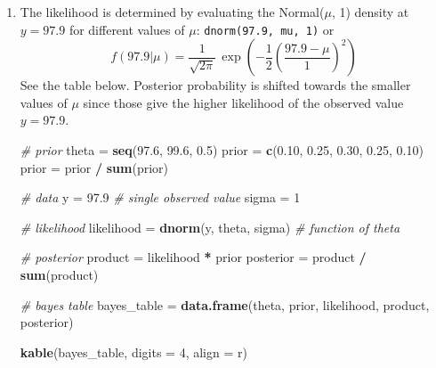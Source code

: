 \documentclass[
]{book}
\newenvironment{Shaded}{\begin{snugshade}}{\end{snugshade}}
\newcommand{\CommentTok}[1]{\textcolor[rgb]{0.56,0.35,0.01}{\textit{#1}}}
\newcommand{\DataTypeTok}[1]{\textcolor[rgb]{0.13,0.29,0.53}{#1}}
\newcommand{\DecValTok}[1]{\textcolor[rgb]{0.00,0.00,0.81}{#1}}
\newcommand{\FloatTok}[1]{\textcolor[rgb]{0.00,0.00,0.81}{#1}}
\newcommand{\KeywordTok}[1]{\textcolor[rgb]{0.13,0.29,0.53}{\textbf{#1}}}
\newcommand{\NormalTok}[1]{#1}
\newcommand{\OperatorTok}[1]{\textcolor[rgb]{0.81,0.36,0.00}{\textbf{#1}}}
\newcommand{\StringTok}[1]{\textcolor[rgb]{0.31,0.60,0.02}{#1}}
\theoremstyle{definition}
\theoremstyle{definition}
\theoremstyle{definition}
\theoremstyle{remark}
\begin{document}
\begin{enumerate}
\def\labelenumi{\arabic{enumi}.}
\item
  The likelihood is determined by evaluating the Normal(\(\mu\), 1) density at \(y=97.9\) for different values of \(\mu\): \texttt{dnorm(97.9,\ mu,\ 1)} or
  \[
  f(97.9|\mu)  = \frac{1}{\sqrt{2\pi}}\,\exp\left(-\frac{1}{2}\left(\frac{97.9-\mu}{1}\right)^2\right)
  \]
  See the table below. Posterior probability is shifted towards the smaller values of \(\mu\) since those give the higher likelihood of the observed value \(y=97.9\).

\begin{Shaded}
\begin{Highlighting}[]
\CommentTok{\# prior}
\NormalTok{theta =}\StringTok{ }\KeywordTok{seq}\NormalTok{(}\FloatTok{97.6}\NormalTok{, }\FloatTok{99.6}\NormalTok{, }\FloatTok{0.5}\NormalTok{)}
\NormalTok{prior =}\StringTok{ }\KeywordTok{c}\NormalTok{(}\FloatTok{0.10}\NormalTok{, }\FloatTok{0.25}\NormalTok{, }\FloatTok{0.30}\NormalTok{, }\FloatTok{0.25}\NormalTok{, }\FloatTok{0.10}\NormalTok{)}
\NormalTok{prior =}\StringTok{ }\NormalTok{prior }\OperatorTok{/}\StringTok{ }\KeywordTok{sum}\NormalTok{(prior)}

\CommentTok{\# data}
\NormalTok{y =}\StringTok{ }\FloatTok{97.9} \CommentTok{\# single observed value}
\NormalTok{sigma =}\StringTok{ }\DecValTok{1}


\CommentTok{\# likelihood}
\NormalTok{likelihood =}\StringTok{ }\KeywordTok{dnorm}\NormalTok{(y, theta, sigma) }\CommentTok{\# function of theta}

\CommentTok{\# posterior}
\NormalTok{product =}\StringTok{ }\NormalTok{likelihood }\OperatorTok{*}\StringTok{ }\NormalTok{prior}
\NormalTok{posterior =}\StringTok{ }\NormalTok{product }\OperatorTok{/}\StringTok{ }\KeywordTok{sum}\NormalTok{(product)}

\CommentTok{\# bayes table}
\NormalTok{bayes\_table =}\StringTok{ }\KeywordTok{data.frame}\NormalTok{(theta,}
\NormalTok{                     prior,}
\NormalTok{                     likelihood,}
\NormalTok{                     product,}
\NormalTok{                     posterior)}

\KeywordTok{kable}\NormalTok{(bayes\_table, }\DataTypeTok{digits =} \DecValTok{4}\NormalTok{, }\DataTypeTok{align =} \StringTok{\textquotesingle{}r\textquotesingle{}}\NormalTok{)}
\end{Highlighting}
\end{Shaded}


\end{enumerate}
\end{document}

